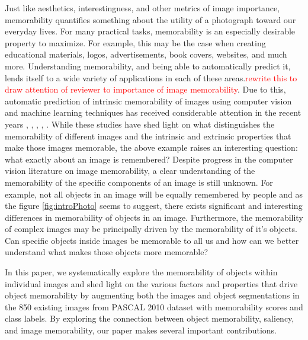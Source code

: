 Just like aesthetics, interestingness, and other metrics of image importance, memorability quantifies something about the utility of a photograph toward our everyday lives. For many practical tasks, memorability is an especially desirable property to maximize. For example, this may be the case when creating educational materials, logos, advertisements, book covers, websites, and much more. Understanding memorability, and being able to automatically predict it, lends itself to a wide variety of applications in each of these areas.\textcolor{red}{rewrite this to draw attention of reviewer to importance of image memorability}. Due to this, automatic prediction of intrinsic memorability of images using computer vision and machine learning techniques has received considerable attention in the recent years \cite{isola11}, \cite{khosla12}, \cite{isola14}, \cite{zoya15}, \cite{kim13}. While these studies have shed light on what distinguishes the memorability of different images and the intrinsic and extrinsic properties that make those images memorable, the above example raises an interesting question: what exactly about an image is remembered? Despite progress in the computer vision literature on image memorability, a clear understanding of the memorability of the specific components of an image is still unknown. For example, not all objects in an image will be equally remembered by people and as the figure \ref{fig:introPhoto} seems to suggest, there exists significant and interesting differences in memorability of objects in an image. Furthermore, the memorability of complex images may be principally driven by the memorability of it's objects. Can specific objects inside images be memorable to all us and how can we better understand what makes those objects more memorable?


In this paper, we systematically explore the memorability of objects within individual images and shed light on the various factors and properties that drive object memorability by augmenting both the images and object segmentations in the 850 existing images from PASCAL 2010 \cite{pascal10} dataset with memorability scores and class labels. By exploring the connection between object memorability, saliency, and image memorability, our paper makes several important contributions. 

